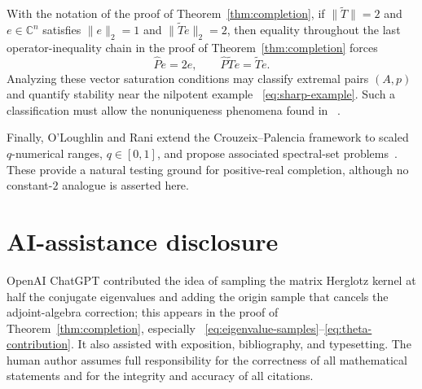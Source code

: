 \documentclass{aomart}
\theoremstyle{definition}
\newcommand{\C}{\mathbb C}
\begin{document}
With the notation of the proof of Theorem~\ref{thm:completion},
if $\lVert\widetilde T\rVert=2$ and $e\in\C^n$ satisfies
$\lVert e\rVert_2=1$ and $\lVert\widetilde Te\rVert_2=2$, then equality
throughout the last
operator-inequality chain in the proof of
Theorem~\ref{thm:completion} forces
\[
  \widehat Pe=2e,
  \qquad
  \widehat P\widetilde Te=\widetilde Te.
\]
Analyzing these vector saturation conditions may classify extremal
pairs $(A,p)$ and quantify stability near the nilpotent example~%
\eqref{eq:sharp-example}.  Such a
classification must allow the nonuniqueness phenomena found in~%
\cite{Li2020}.

Finally, O'Loughlin and Rani extend the Crouzeix--Palencia framework to
scaled $q$-numerical ranges, $q\in[0,1]$, and propose associated
spectral-set problems~\cite{OLoughlinRani2026}.  These provide a natural
testing ground for positive-real completion, although no constant-$2$
analogue is asserted here.

\section*{AI-assistance disclosure}

OpenAI ChatGPT contributed the idea of sampling the matrix Herglotz
kernel at half the conjugate eigenvalues and adding the origin sample
that cancels the adjoint-algebra correction; this appears in the proof
of Theorem~\ref{thm:completion}, especially~%
\eqref{eq:eigenvalue-samples}--\eqref{eq:theta-contribution}.  It also
assisted with exposition, bibliography, and typesetting.  The human
author assumes full responsibility for the correctness of all
mathematical statements and for the integrity and accuracy of all
citations.



\end{document}
